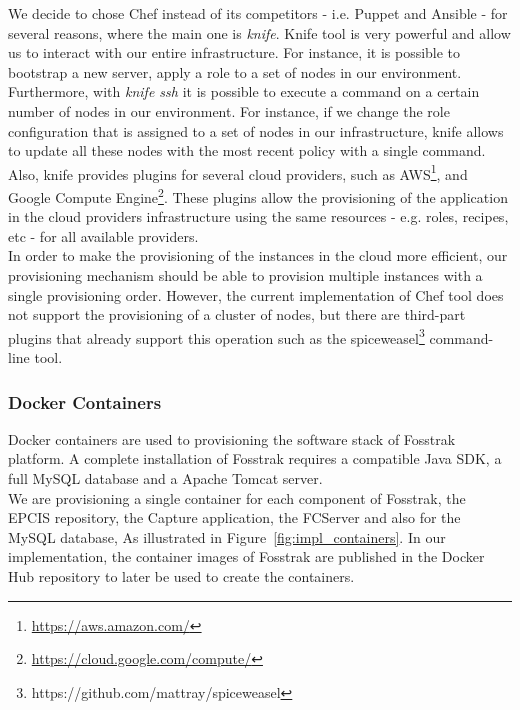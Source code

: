 We decide to chose Chef instead of its competitors - i.e. Puppet and Ansible - for several
reasons, where the main one is \textit{knife}. Knife tool is very powerful and allow us to
interact with our entire infrastructure. For instance, it is possible to bootstrap a new server,
apply a role to a set of nodes in our environment. Furthermore, with \textit{knife ssh} it is possible
to execute a command on a certain number of nodes in our environment. For instance, if we change
the role configuration that is assigned to a set of nodes in our infrastructure, knife allows to
update all these nodes with the most recent policy with a single command. Also, knife provides plugins
for several cloud providers, such as \gls{AWS}\footnote{\url{https://aws.amazon.com/}}, and Google
Compute Engine\footnote{\url{https://cloud.google.com/compute/}}. These plugins allow the
provisioning of the application in the cloud providers infrastructure using the same
resources - e.g. roles, recipes, etc - for all available providers.\\

In order to make the provisioning of the instances in the cloud more efficient, our
provisioning mechanism should be able to provision multiple instances with a single
provisioning order. However, the current implementation of Chef tool does not support
the provisioning of a cluster of nodes, but there are third-part plugins that already
support this operation such as the spiceweasel\footnote{https://github.com/mattray/spiceweasel}
command-line tool.

\subsubsection{Docker Containers}
\label{subs:impl_docker}
Docker containers are used to provisioning the software stack of Fosstrak platform. A complete
installation of Fosstrak requires a compatible Java \gls{SDK}, a full MySQL database and a Apache Tomcat
server.\\

We are provisioning a single container for each component of Fosstrak, the \gls{EPCIS} repository,
the Capture application, the \gls{FCServer} and also for the MySQL database, As illustrated in Figure~\ref{fig:impl_containers}.
In our implementation, the container images of Fosstrak are published in the Docker Hub repository
to later be used to create the containers.\\

